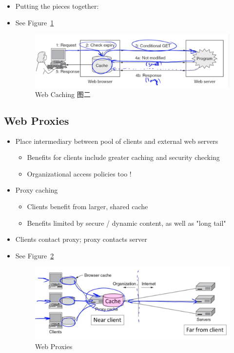 \documentclass[12pt]{ctexart}   %
\begin{document}
\begin{itemize}
		\item Putting the pieces together:
		\item See Figure~\ref{fig:8-6-3}
		  
		 \begin{figure}[h!] %
		\centering
		 \includegraphics[scale=0.7]{images/8-6-3}
		\caption{ Web Caching 图二}
		 \label{fig:8-6-3}
		 \end{figure}
	\end{itemize}
	
	\subsection{Web Proxies}
	\begin{itemize}
		\item Place intermediary between pool of clients and external web servers
		\begin{itemize}
			\item Benefits for clients include greater caching and security checking
			\item Organizational access policies too !
		\end{itemize}
		
		\item Proxy caching
		\begin{itemize}
			\item Clients benefit from larger, shared cache
			\item Benefits limited by secure / dynamic content, as well as "long tail"
		\end{itemize}
		
		\item Clients contact proxy; proxy contacts server
		\item See Figure~\ref{fig:8-6-4}
		  
		 \begin{figure}[h!] %
		\centering
		 \includegraphics[scale=0.7]{images/8-6-4}
		\caption{ Web Proxies }
		 \label{fig:8-6-4}
		 \end{figure}
	\end{itemize}
	
\end{document}
